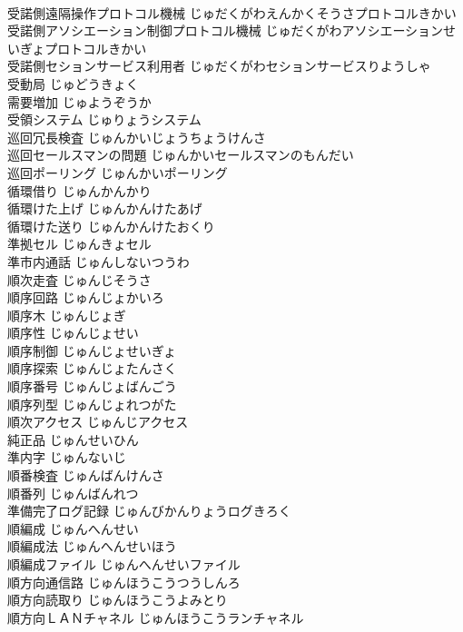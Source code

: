 \documentclass[8pt]{extreport}
\begin{document}
\begin{CJK}{UTF8}{min}
\\	受諾側遠隔操作プロトコル機械	じゅだくがわえんかくそうさプロトコルきかい	
\\	受諾側アソシエーション制御プロトコル機械	じゅだくがわアソシエーションせいぎょプロトコルきかい	
\\	受諾側セションサービス利用者	じゅだくがわセションサービスりようしゃ	
\\	受動局	じゅどうきょく	
\\	需要増加	じゅようぞうか	
\\	受領システム	じゅりょうシステム	
\\	巡回冗長検査	じゅんかいじょうちょうけんさ	
\\	巡回セールスマンの問題	じゅんかいセールスマンのもんだい	
\\	巡回ポーリング	じゅんかいポーリング	
\\	循環借り	じゅんかんかり	
\\	循環けた上げ	じゅんかんけたあげ	
\\	循環けた送り	じゅんかんけたおくり	
\\	準拠セル	じゅんきょセル	
\\	準市内通話	じゅんしないつうわ	
\\	順次走査	じゅんじそうさ	
\\	順序回路	じゅんじょかいろ	
\\	順序木	じゅんじょぎ	
\\	順序性	じゅんじょせい	
\\	順序制御	じゅんじょせいぎょ	
\\	順序探索	じゅんじょたんさく	
\\	順序番号	じゅんじょばんごう	
\\	順序列型	じゅんじょれつがた	
\\	順次アクセス	じゅんじアクセス	
\\	純正品	じゅんせいひん	
\\	準内字	じゅんないじ	
\\	順番検査	じゅんばんけんさ	
\\	順番列	じゅんばんれつ	
\\	準備完了ログ記録	じゅんびかんりょうログきろく	
\\	順編成	じゅんへんせい	
\\	順編成法	じゅんへんせいほう	
\\	順編成ファイル	じゅんへんせいファイル	
\\	順方向通信路	じゅんほうこうつうしんろ	
\\	順方向読取り	じゅんほうこうよみとり	
\\	順方向ＬＡＮチャネル	じゅんほうこうランチャネル	

\end{CJK}
\end{document}

